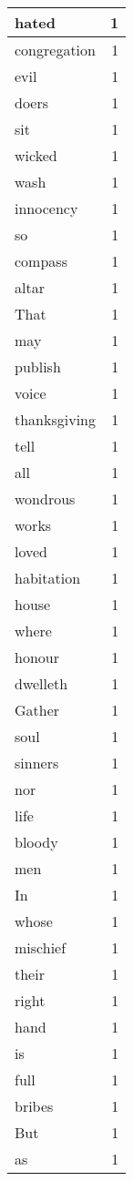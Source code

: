 \begin{center}
\begin{longtable}{l|r}
hated & 1 \\ \hline
congregation & 1 \\ \hline
evil & 1 \\ \hline
doers & 1 \\ \hline
sit & 1 \\ \hline
wicked & 1 \\ \hline
wash & 1 \\ \hline
innocency & 1 \\ \hline
so & 1 \\ \hline
compass & 1 \\ \hline
altar & 1 \\ \hline
That & 1 \\ \hline
may & 1 \\ \hline
publish & 1 \\ \hline
voice & 1 \\ \hline
thanksgiving & 1 \\ \hline
tell & 1 \\ \hline
all & 1 \\ \hline
wondrous & 1 \\ \hline
works & 1 \\ \hline
loved & 1 \\ \hline
habitation & 1 \\ \hline
house & 1 \\ \hline
where & 1 \\ \hline
honour & 1 \\ \hline
dwelleth & 1 \\ \hline
Gather & 1 \\ \hline
soul & 1 \\ \hline
sinners & 1 \\ \hline
nor & 1 \\ \hline
life & 1 \\ \hline
bloody & 1 \\ \hline
men & 1 \\ \hline
In & 1 \\ \hline
whose & 1 \\ \hline
mischief & 1 \\ \hline
their & 1 \\ \hline
right & 1 \\ \hline
hand & 1 \\ \hline
is & 1 \\ \hline
full & 1 \\ \hline
bribes & 1 \\ \hline
But & 1 \\ \hline
as & 1 \\ \hline

\end{longtable}
\end{center}
